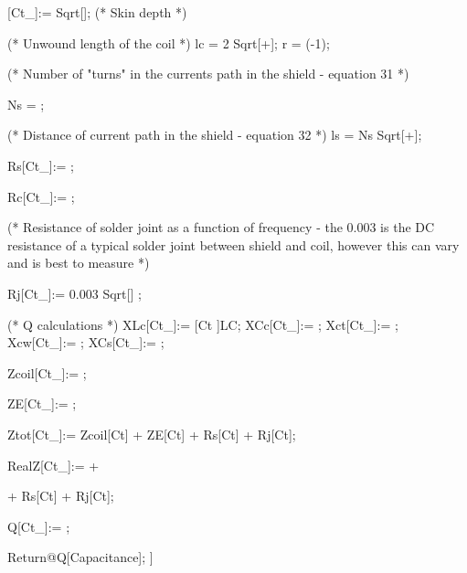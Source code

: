 \begin{mmaCell}
  \mmaLoc{\(\delta\)}[Ct_]:= Sqrt[]; (* Skin depth *)
  
  (* Unwound length of the coil *)
  lc = 2\mmaDef{\(\pi\)} Sqrt[+];
  r = (-1);
  
  (* Number of "turns" in the currents path in the shield 
  - equation 31 *)
  
  Ns = ;
  
  (* Distance of current path in the shield - equation 32 *)
  ls = Ns Sqrt[+];
  
  Rs[Ct_]:= ;
  
  Rc[Ct_]:= ;
  
  (* Resistance of solder joint as a function of frequency - 
  the 0.003 is the DC resistance of a typical solder joint 
  between shield and coil, however this can vary 
  and is best to measure *)
  
  Rj[Ct_]:= 0.003 Sqrt[] \mmaDef{\(\Omega\)};
  
  (* Q calculations *)
  XLc[Ct_]:= [Ct ]LC;
  XCc[Ct_]:= ;
  Xct[Ct_]:= ;
  Xcw[Ct_]:= ;
  XCs[Ct_]:= ;
  
  Zcoil[Ct_]:= ;
  
  ZE[Ct_]:= ;
  
  Ztot[Ct_]:= Zcoil[Ct] + ZE[Ct] + Rs[Ct] + Rj[Ct];
  
  RealZ[Ct_]:=  +
  
  
  + Rs[Ct] + Rj[Ct];
  
  Q[Ct_]:= ;
  
  Return@Q[Capacitance];
]
\end{mmaCell}

